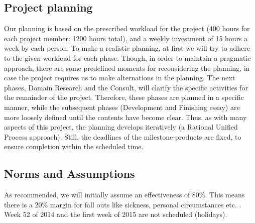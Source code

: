 \documentclass{article}
\begin{document}
\begin{itemize}
\section{Project planning}
Our planning is based on the prescribed workload for the project (400 hours for each project member: 1200 hours total), and a weekly investment of 15 hours a week by each person. To make a realistic planning, at first we will try to adhere to the given workload for each phase.  Though, in order to maintain a pragmatic approach, there are some predefined moments for reconsidering the planning, in case the project requires us to make alternations in the planning. The next phases, Domain Research and the Consult, will clarify the specific activities for the remainder of the project. Therefore, these phases are planned in a specific manner, while the subsequent phases (Development and Finishing essay) are more loosely defined until the contents have become clear. Thus, as with many aspects of this project, the planning develops iteratively (a Rational Unified Process approach). Still, the deadlines of the milestone-products are fixed, to ensure completion within the scheduled time.

\subsection{Norms and Assumptions}
As recommended, we will initially assume an effectiveness of 80\%. This means there is a 20\% margin for fall outs like sickness, personal circumstances etc. . Week 52 of 2014 and the first week of 2015 are not scheduled (holidays). 


\end{itemize}
\end{document}
